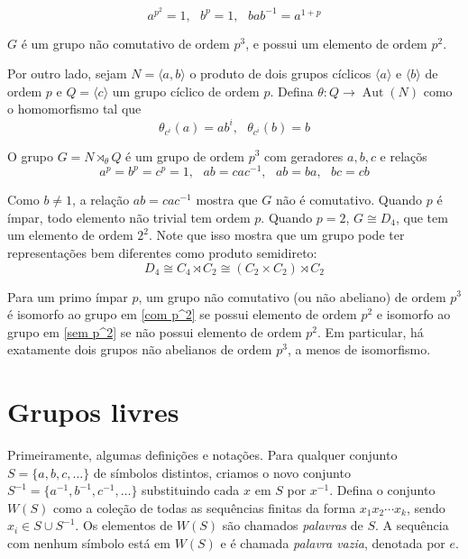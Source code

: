 \documentclass[a4paper,portuguese,11pt,twoside, leqno]{book}
\DeclareMathOperator{\aut}{Aut}
\theoremstyle{definition}
\begin{document}
	\begin{equation}
	\label{com p^2}
	a^{p^2} = 1, \text{ }b^p=1, \text{ }bab^{-1} = a^{1+p}
	\end{equation}
	\par\vspace{0.3cm} $G$ é um grupo não comutativo de ordem $p^3$, e possui um elemento de ordem $p^2$.
	\par\vspace{0.3cm} Por outro lado, sejam $N = \langle a,b\rangle$ o produto de dois grupos cíclicos $\langle a \rangle$ e $\langle b \rangle$ de ordem $p$ e $Q = \langle c \rangle$ um grupo cíclico de ordem $p$. Defina $\theta: Q\to\aut(N)$ como o homomorfismo tal que
	\begin{equation*}
	\theta_{c^i}(a) = ab^i, \text{ }\theta_{c^i}(b) = b
	\end{equation*}
	\par\vspace{0.3cm} O grupo $G = N\rtimes_{\theta} Q$ é um grupo de ordem $p^3$ com geradores $a,b,c$ e relaçõs
	\begin{equation}
	\label{sem p^2}
	a^p=b^p=c^p=1, \text{ }ab = cac^{-1}, \text{ }ab = ba, \text{ }bc = cb 
	\end{equation}
	\par\vspace{0.3cm} Como $b\neq 1$, a relação $ab = cac^{-1}$ mostra que $G$ não é comutativo. Quando $p$ é ímpar, todo elemento não trivial tem ordem $p$. Quando $p=2$, $G\cong D_4$, que tem um elemento de ordem $2^2$. Note que isso mostra que um grupo pode ter representações bem diferentes como produto semidireto:
	\begin{equation*}
	D_4\cong C_4\rtimes C_2\cong (C_2\times C_2)\rtimes C_2
	\end{equation*}
	\par\vspace{0.3cm} Para um primo ímpar $p$, um grupo não comutativo (ou não abeliano) de ordem $p^3$ é isomorfo ao grupo em \eqref{com p^2} se possui elemento de ordem $p^2$ e isomorfo ao grupo em \eqref{sem p^2} se não possui elemento de ordem $p^2$. Em particular, há exatamente dois grupos não abelianos de ordem $p^3$, a menos de isomorfismo.
	
	
	\chapter{Grupos livres}\label{capitulo grupos livres}
	
	\hspace{21pt} Primeiramente, algumas definições e notações. Para qualquer conjunto $S = \{ a, b, c, \dots \}$ de símbolos distintos, criamos o novo conjunto $S^{-1} = \{ a^{-1}, b^{-1}, c^{-1}, \dots \}$ substituindo cada $x$ em $S$ por $x^{-1}$. Defina o conjunto $W(S)$ como a coleção de todas as sequências finitas da forma $x_1x_2\cdots x_k$, sendo $x_i\in S\cup S^{-1}$. Os elementos de $W(S)$ são chamados \textit{palavras} de $S$. A sequência com nenhum símbolo está em $W(S)$ e é chamada \textit{palavra vazia}, denotada por $e$.
	
\end{document}
